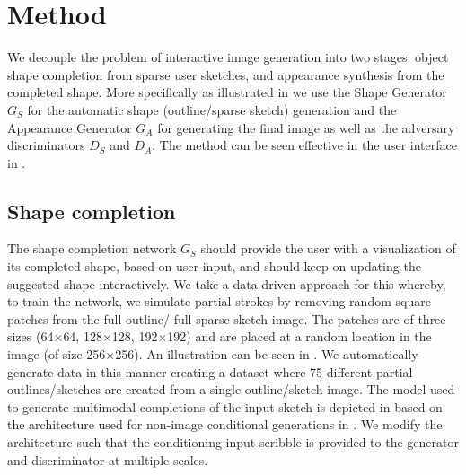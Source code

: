 \section{Method}
We decouple the problem of interactive image generation into two stages: object shape completion from sparse user sketches, and appearance synthesis from the completed shape. More specifically as illustrated in  we use the Shape Generator $G_S$ for the automatic shape (outline/sparse sketch) generation and the Appearance Generator $G_A$ for generating the final image as well as the adversary discriminators $D_S$ and $D_A$. The method can be seen effective in the user interface in .

\subsection{Shape completion}
\label{sec:shape}
The shape completion network $G_S$ should provide the user with a visualization of its  completed shape, based on user input, and should keep on updating the suggested shape interactively. 
We take a data-driven approach for this whereby, to train the network, we simulate partial strokes by removing random square patches from the full outline/ full sparse sketch image. 
The patches are of three sizes (64$\times$64, 128$\times$128, 192$\times$192) and are placed at a random location in the image (of size 256$\times$256). An illustration can be seen in .
We automatically generate data in this manner creating a dataset where 75 different partial outlines/sketches are created from a single outline/sketch image.
The model used to generate multimodal completions of the input sketch is depicted in  based on the architecture used for non-image conditional generations in \cite{mescheder2018training}. We modify the architecture such that the conditioning input scribble is provided to the generator and discriminator at multiple scales. 




